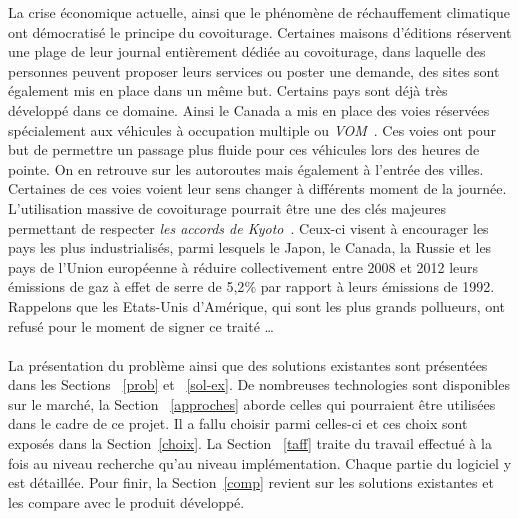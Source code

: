 \documentclass[12pt, a4paper, oneside]{article}
\begin{document}
    \indent La crise économique actuelle, ainsi que le phénomène de réchauffement climatique ont démocratisé le principe du covoiturage. Certaines maisons d'éditions réservent une plage de leur journal entièrement dédiée au covoiturage, dans laquelle des personnes peuvent proposer leurs services ou poster une demande, des sites sont également mis en place dans un même but. Certains pays sont déjà très développé dans ce domaine. Ainsi le Canada a mis en place des voies réservées spécialement aux véhicules à occupation multiple ou \textit{VOM}~\cite{article-VOM}. Ces voies ont pour but de permettre un passage plus fluide pour ces véhicules lors des heures de pointe. On en retrouve sur les autoroutes mais également à l'entrée des villes. Certaines de ces voies voient leur sens changer à différents moment de la journée. L'utilisation massive de covoiturage pourrait être une des clés majeures permettant de respecter \textit{les accords de Kyoto}~\cite{article-Kyoto}. Ceux-ci visent à encourager les pays les plus industrialisés, parmi lesquels le Japon, le Canada, la Russie et les pays de l'Union européenne à réduire collectivement entre 2008 et 2012 leurs émissions de gaz à effet de serre de 5,2$\%$ par rapport à leurs émissions de 1992. Rappelons que les Etats-Unis d'Amérique, qui sont les plus grands pollueurs, ont refusé pour le moment de signer ce traité \dots\\\\
    \indent La présentation du problème ainsi que des solutions existantes sont présentées dans les Sections ~\ref{prob} et ~\ref{sol-ex}. De nombreuses technologies sont disponibles sur le marché, la Section ~\ref{approches} aborde celles qui pourraient être utilisées dans le cadre de ce projet. Il a fallu choisir parmi celles-ci et ces choix sont exposés dans la Section~\ref{choix}. La Section~ \ref{taff} traite du travail effectué à la fois au niveau recherche qu'au niveau implémentation. Chaque partie du logiciel y est détaillée. Pour finir, la Section~\ref{comp} revient sur les solutions existantes et les compare avec le produit développé.
    
\end{document}

